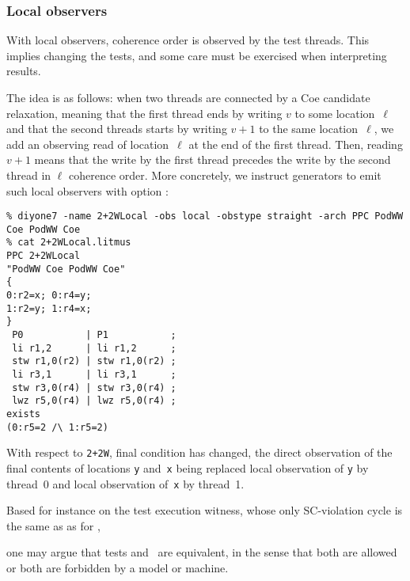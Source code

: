 \subsubsection{Local observers}
With local observers, coherence order is observed by the test threads.
This implies changing the tests, and some care must be exercised when
interpreting results.

The idea is as follows: when two threads are connected by a Coe candidate
relaxation, meaning that the first thread ends by writing $v$ to some location~$\ell$ and that the second threads starts by writing $v+1$ to the same location~$\ell$, we add an observing read of location~$\ell$ at the end of
the first thread. Then, reading $v+1$ means that the write by the first thread
precedes the write by the second thread in $\ell$ coherence order.
More concretely, we instruct \diy{} generators to emit such local observers
with option :
\begin{verbatim}
% diyone7 -name 2+2WLocal -obs local -obstype straight -arch PPC PodWW Coe PodWW Coe
% cat 2+2WLocal.litmus
PPC 2+2WLocal
"PodWW Coe PodWW Coe"
{
0:r2=x; 0:r4=y;
1:r2=y; 1:r4=x;
}
 P0           | P1           ;
 li r1,2      | li r1,2      ;
 stw r1,0(r2) | stw r1,0(r2) ;
 li r3,1      | li r3,1      ;
 stw r3,0(r4) | stw r3,0(r4) ;
 lwz r5,0(r4) | lwz r5,0(r4) ;
exists
(0:r5=2 /\ 1:r5=2)
\end{verbatim}
With respect to \texttt{2+2W}, final condition has changed, the direct
observation of the final contents of locations \texttt{y} and~\texttt{x}
being replaced local observation of \texttt{y} by thread~0 and
local observation of~\texttt{x} by thread~1.

Based for instance on the test execution witness, whose only SC-violation
cycle is the same as as  for ,
\begin{center}
\end{center}
one may argue that tests
 and~ are equivalent, in the sense that
both are allowed or both are forbidden by a model or machine.

